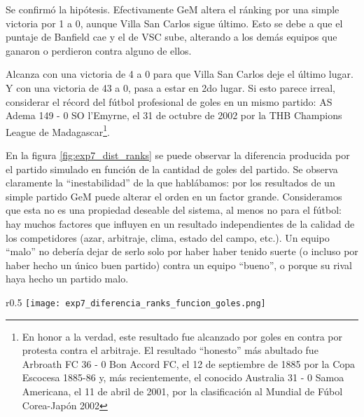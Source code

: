 \begin{LaTeXdescription}
    \item[Resultados, an\'alisis y discusi\'on]
        Se confirmó la hipótesis. Efectivamente GeM altera el ránking por una simple victoria por 1 a 0, aunque Villa San Carlos sigue último. Esto se debe a que el puntaje de Banfield cae y el de VSC sube, alterando a los demás equipos que ganaron o perdieron contra alguno de ellos.
        
        Alcanza con una victoria de 4 a 0 para que Villa San Carlos deje el último lugar. Y con una victoria de 43 a 0, pasa a estar en 2do lugar. Si esto parece irreal, considerar el récord del fútbol profesional de goles en un mismo partido: AS Adema 149 - 0 SO l'Emyrne, el 31 de octubre de 2002 por la THB Champions League de Madagascar\footnote{En honor a la verdad, este resultado fue alcanzado por goles en contra por protesta contra el arbitraje. El resultado ``honesto'' más abultado fue Arbroath FC 36 - 0 Bon Accord FC, el 12 de septiembre de 1885 por la Copa Escocesa 1885-86 y, más recientemente, el conocido Australia 31 - 0 Samoa Americana, el 11 de abril de 2001, por la clasificación al Mundial de Fúbol Corea-Japón 2002}.
        
        En la figura \ref{fig:exp7_dist_ranks} se puede observar la diferencia producida por el partido simulado en función de la cantidad de goles del partido. Se observa claramente la ``inestabilidad'' de la que hablábamos: por los resultados de un simple partido GeM puede alterar el orden en un factor grande. Consideramos que esta no es una propiedad deseable del sistema, al menos no para el fútbol: hay muchos factores que influyen en un resultado independientes de la calidad de los competidores (azar, arbitraje, clima, estado del campo, etc.). Un equipo ``malo'' no debería dejar de serlo solo por haber haber tenido suerte (o incluso por haber hecho un único buen partido) contra un equipo ``bueno'', o porque su rival haya hecho un partido malo.
\end{LaTeXdescription}

\begin{wrapfigure}{r}{0.5\textwidth}
    \texttt{[image: exp7\_diferencia\_ranks\_funcion\_goles.png]}
    \caption{Distancia Ranking GeM y Oficial vs Ranking GeM con partido Artificial}
    \label{fig:exp7_dist_ranks}
\end{wrapfigure}
\noindent

